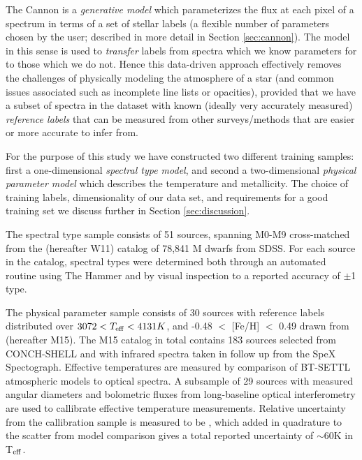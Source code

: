 \documentclass[modern]{aastex62}
\begin{document}
The Cannon is a \emph{generative model} which parameterizes the flux at each pixel of a spectrum in terms of a set of stellar labels (a flexible number of parameters chosen by the user; described in more detail in Section \ref{sec:cannon}). The model in this sense is used to \emph{transfer} labels from spectra which we know parameters for to those which we do not. Hence this data-driven approach effectively removes the challenges of physically modeling the atmosphere of a star (and common issues associated such as incomplete line lists or opacities), provided that we have a subset of spectra in the dataset with known (ideally very accurately measured) \emph{reference labels} that can be measured from other surveys/methods that are easier or more accurate to infer from. 

For the purpose of this study we have constructed two different training samples: first a one-dimensional \emph{spectral type model}, and second a two-dimensional \emph{physical parameter model} which describes the temperature and metallicity. The choice of training labels, dimensionality of our data set, and requirements for a good training set we discuss further in Section \ref{sec:discussion}.

The spectral type sample consists of 51 sources, spanning M0-M9 cross-matched from the \citealt{West:2011} (hereafter W11) catalog of 78,841 M dwarfs from SDSS. For each source in the catalog, spectral types were determined both through an automated routine using The Hammer \citep{Covey:2007} and by visual inspection to a reported accuracy of $\pm$1 type.

The physical parameter sample consists of 30 sources with reference labels distributed over $3072 < T_{\rm eff} < 4131K$, and -0.48 $<$ [Fe/H] $<$ 0.49 drawn from \citealt{Mann:2015} (hereafter M15). The M15 catalog in total contains 183 sources selected from CONCH-SHELL \citep{Gaidos:2013} and with infrared spectra taken in follow up from the SpeX Spectograph. Effective temperatures are measured by comparison of BT-SETTL atmospheric models \citep{Allard:2011} to optical spectra. A subsample of 29 sources with measured angular diameters and bolometric fluxes from long-baseline optical interferometry are used to callibrate effective temperature measurements. Relative uncertainty from the callibration sample is measured to be \color{red}{$\sim$30K (check this)}\color{black}, which added in quadrature to the scatter from model comparison gives a total reported uncertainty of $\sim$60K in T$_{\rm eff}$. 
\end{document}
